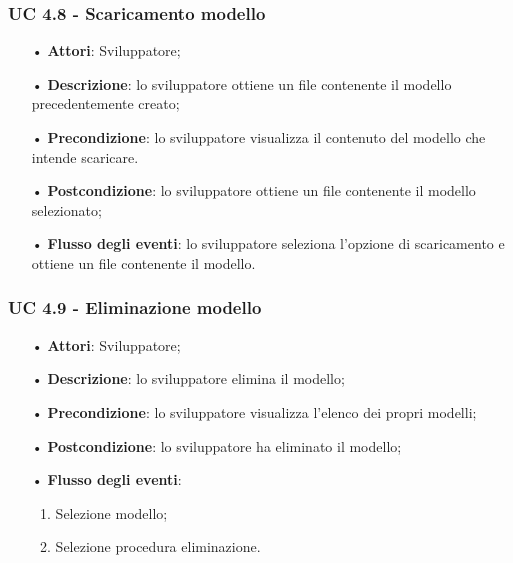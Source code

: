 \subsubsection{UC 4.8 - Scaricamento modello}
\begin{itemize}
\item[•]\textbf{Attori}: Sviluppatore;
\item[•]\textbf{Descrizione}: lo sviluppatore ottiene un file contenente il modello precedentemente creato;
\item[•]\textbf{Precondizione}: lo sviluppatore visualizza il contenuto del modello che intende scaricare.
\item[•]\textbf{Postcondizione}: lo sviluppatore ottiene un file contenente il modello selezionato;
\item[•]\textbf{Flusso degli eventi}: lo sviluppatore seleziona l'opzione di scaricamento e ottiene un file contenente il modello.
\end{itemize}

\subsubsection{UC 4.9 - Eliminazione modello}
\begin{itemize}
	\item[•]\textbf{Attori}: Sviluppatore;
	\item[•]\textbf{Descrizione}: lo sviluppatore elimina il modello;
	\item[•]\textbf{Precondizione}: lo sviluppatore visualizza l'elenco dei propri modelli;
	\item[•]\textbf{Postcondizione}: lo sviluppatore ha eliminato il modello; 
	\item[•]\textbf{Flusso degli eventi}: 
	\begin{enumerate}
		\item Selezione modello;
		\item Selezione procedura eliminazione.
	\end{enumerate}   
\end{itemize}